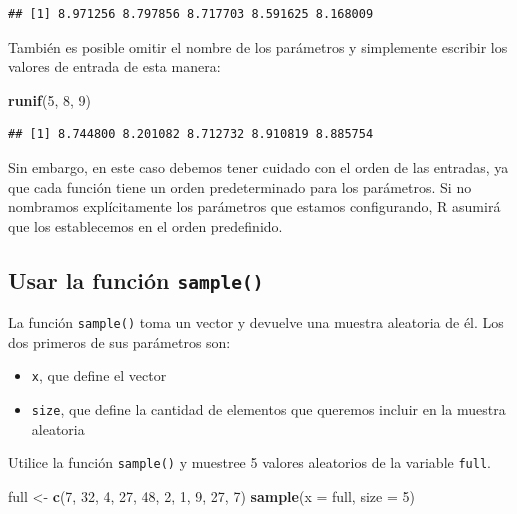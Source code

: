 \documentclass[
]{book}
\newenvironment{Shaded}{\begin{snugshade}}{\end{snugshade}}
\newcommand{\DataTypeTok}[1]{\textcolor[rgb]{0.13,0.29,0.53}{#1}}
\newcommand{\DecValTok}[1]{\textcolor[rgb]{0.00,0.00,0.81}{#1}}
\newcommand{\KeywordTok}[1]{\textcolor[rgb]{0.13,0.29,0.53}{\textbf{#1}}}
\newcommand{\NormalTok}[1]{#1}
\newcommand{\StringTok}[1]{\textcolor[rgb]{0.31,0.60,0.02}{#1}}
\providecommand{\tightlist}{%
  \setlength{\itemsep}{0pt}\setlength{\parskip}{0pt}}
\begin{document}
\begin{verbatim}
## [1] 8.971256 8.797856 8.717703 8.591625 8.168009
\end{verbatim}

También es posible omitir el nombre de los parámetros y simplemente escribir los valores de entrada de esta manera:

\begin{Shaded}
\begin{Highlighting}[]
\KeywordTok{runif}\NormalTok{(}\DecValTok{5}\NormalTok{, }\DecValTok{8}\NormalTok{, }\DecValTok{9}\NormalTok{)}
\end{Highlighting}
\end{Shaded}

\begin{verbatim}
## [1] 8.744800 8.201082 8.712732 8.910819 8.885754
\end{verbatim}

Sin embargo, en este caso debemos tener cuidado con el orden de las entradas, ya que cada función tiene un orden predeterminado para los parámetros. Si no nombramos explícitamente los parámetros que estamos configurando, R asumirá que los establecemos en el orden predefinido.

\hypertarget{usar-la-funciuxf3n-sample}{%
\subsection{\texorpdfstring{Usar la función \texttt{sample()}}{Usar la función sample()}}\label{usar-la-funciuxf3n-sample}}

La función \texttt{sample()} toma un vector y devuelve una muestra aleatoria de él. Los dos primeros de sus parámetros son:

\begin{itemize}
\tightlist
\item
  \texttt{x}, que define el vector
\item
  \texttt{size}, que define la cantidad de elementos que queremos incluir en la muestra aleatoria
\end{itemize}

Utilice la función \texttt{sample()} y muestree 5 valores aleatorios de la variable \texttt{full}.

\begin{Shaded}
\begin{Highlighting}[]
\NormalTok{full <-}\StringTok{ }\KeywordTok{c}\NormalTok{(}\DecValTok{7}\NormalTok{, }\DecValTok{32}\NormalTok{, }\DecValTok{4}\NormalTok{, }\DecValTok{27}\NormalTok{, }\DecValTok{48}\NormalTok{, }\DecValTok{2}\NormalTok{, }\DecValTok{1}\NormalTok{, }\DecValTok{9}\NormalTok{, }\DecValTok{27}\NormalTok{, }\DecValTok{7}\NormalTok{)}
\KeywordTok{sample}\NormalTok{(}\DataTypeTok{x =}\NormalTok{ full, }\DataTypeTok{size =} \DecValTok{5}\NormalTok{)}
\end{Highlighting}
\end{Shaded}
\end{document}
